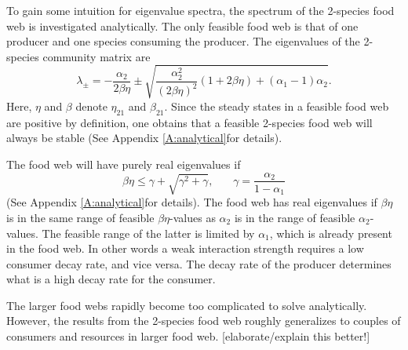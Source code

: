 To gain some intuition for eigenvalue spectra, the spectrum of the 2-species food web is investigated analytically. The only feasible food web is that of one producer and one species consuming the producer. The eigenvalues of the 2-species community matrix are
\begin{equation}
    \lambda_{\pm} = -\frac{\alpha_2}{2\beta\eta}\pm \sqrt{\frac{\alpha_2^2}{(2\beta\eta)^2}\left(1 + 2\beta\eta \right) + \left(\alpha_1 - 1 \right)\alpha_2}.
    \label{eq:eig_2}
\end{equation}
Here, $\eta$ and $\beta$ denote $\eta_{21}$ and $\beta_{21}$. Since the steady states in a feasible food web are positive by definition, one obtains that a feasible 2-species food web will always be stable (See Appendix \ref{A:analytical}for details).

The food web will have purely real eigenvalues if
\begin{equation}
    \beta\eta \leq \gamma + \sqrt{\gamma^2 + \gamma}, \:\:\:\:\:\:\:\: \gamma = \frac{\alpha_2}{1-\alpha_1}
\end{equation}
(See Appendix \ref{A:analytical}for details). The food web has real eigenvalues if $\beta\eta$ is in the same range of feasible $\beta\eta$-values as $\alpha_2$ is in the range of feasible $\alpha_2$-values. The feasible range of the latter is limited by $\alpha_1$, which is already present in the food web. In other words a weak interaction strength requires a low consumer decay rate, and vice versa. The decay rate of the producer determines what is a high decay rate for the consumer. 


The larger food webs rapidly become too complicated to solve analytically.
However, the results from the 2-species food web roughly generalizes to couples of consumers and resources in larger food web. [elaborate/explain this better!]
